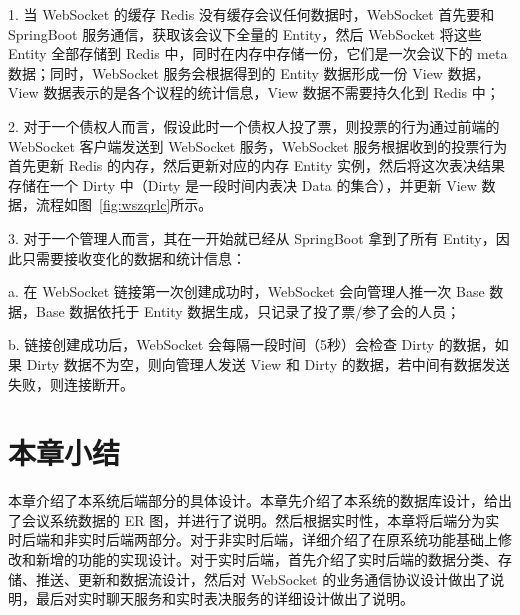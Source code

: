   1. 当 WebSocket 的缓存 Redis 没有缓存会议任何数据时，WebSocket 首先要和 SpringBoot 服务通信，获取该会议下全量的 Entity，然后 WebSocket 将这些 Entity 全部存储到 Redis 中，同时在内存中存储一份，它们是一次会议下的 meta 数据；同时，WebSocket 服务会根据得到的 Entity 数据形成一份 View 数据，View 数据表示的是各个议程的统计信息，View 数据不需要持久化到 Redis 中；
  
  2. 对于一个债权人而言，假设此时一个债权人投了票，则投票的行为通过前端的 WebSocket 客户端发送到 WebSocket 服务，WebSocket 服务根据收到的投票行为首先更新 Redis 的内存，然后更新对应的内存 Entity 实例，然后将这次表决结果存储在一个 Dirty 中（Dirty 是一段时间内表决 Data 的集合），并更新 View 数据，流程如图~\ref{fig:wszqrlc}所示。

  3. 对于一个管理人而言，其在一开始就已经从 SpringBoot 拿到了所有 Entity，因此只需要接收变化的数据和统计信息：

  \quad{}\quad{}a. 在 WebSocket 链接第一次创建成功时，WebSocket 会向管理人推一次 Base 数据，Base 数据依托于 Entity 数据生成，只记录了投了票/参了会的人员；

  \quad{}\quad{}b. 链接创建成功后，WebSocket 会每隔一段时间（5秒）会检查 Dirty 的数据，如果 Dirty 数据不为空，则向管理人发送 View 和 Dirty 的数据，若中间有数据发送失败，则连接断开。

  \section{本章小结}
  本章介绍了本系统后端部分的具体设计。本章先介绍了本系统的数据库设计，给出了会议系统数据的 ER 图，并进行了说明。然后根据实时性，本章将后端分为实时后端和非实时后端两部分。对于非实时后端，详细介绍了在原系统功能基础上修改和新增的功能的实现设计。对于实时后端，首先介绍了实时后端的数据分类、存储、推送、更新和数据流设计，然后对 WebSocket 的业务通信协议设计做出了说明，最后对实时聊天服务和实时表决服务的详细设计做出了说明。